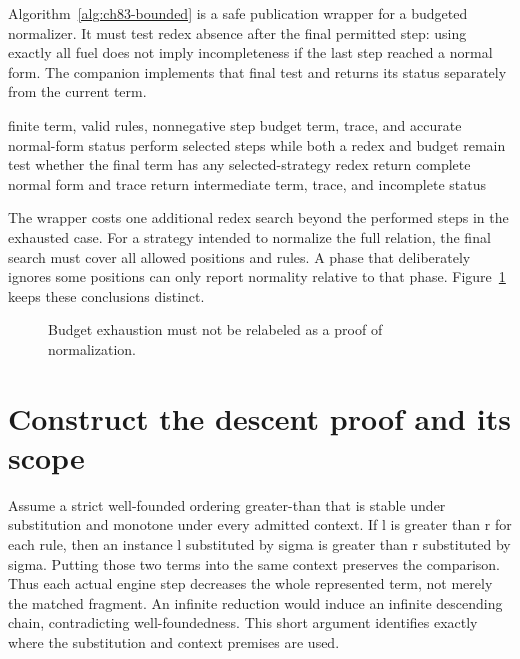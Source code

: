 Algorithm~\ref{alg:ch83-bounded} is a safe publication wrapper for a budgeted normalizer.
It must test redex absence after the final permitted step: using exactly all fuel does not imply incompleteness if the last step reached a normal form.
The companion implements that final test and returns its status separately from the current term.

\begin{algorithm}[htbp]
\caption{Report normalization status independently of the number of performed steps.}
\label{alg:ch83-bounded}
\begin{pseudocode}
\Require finite term, valid rules, nonnegative step budget
\Ensure term, trace, and accurate normal-form status
\State perform selected steps while both a redex and budget remain
\State test whether the final term has any selected-strategy redex
 \State return complete normal form and trace
\Else \State return intermediate term, trace, and incomplete status
\EndIf
\end{pseudocode}
\end{algorithm}

The wrapper costs one additional redex search beyond the performed steps in the exhausted case.
For a strategy intended to normalize the full relation, the final search must cover all allowed positions and rules.
A phase that deliberately ignores some positions can only report normality relative to that phase.
Figure~\ref{fig:ch83-outcomes} keeps these conclusions distinct.

\begin{figure}[htbp]
\centering
{}
\caption{Budget exhaustion must not be relabeled as a proof of normalization.}
\label{fig:ch83-outcomes}
\end{figure}

\section{Construct the descent proof and its scope}
\label{sec:ch83-proof}
Assume a strict well-founded ordering greater-than that is stable under substitution and monotone under every admitted context.
If l is greater than r for each rule, then an instance l substituted by sigma is greater than r substituted by sigma.
Putting those two terms into the same context preserves the comparison.
Thus each actual engine step decreases the whole represented term, not merely the matched fragment.
An infinite reduction would induce an infinite descending chain, contradicting well-foundedness.
This short argument identifies exactly where the substitution and context premises are used.

